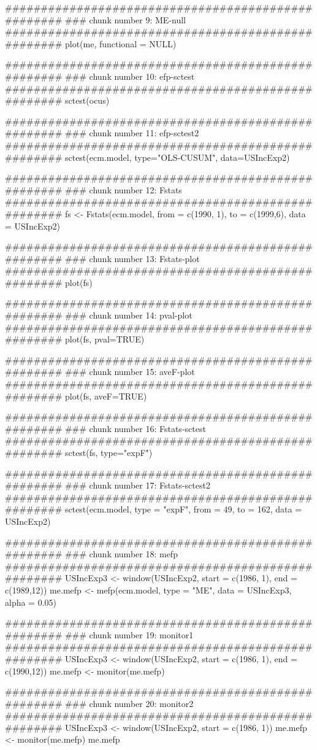 \begin{Examples}
\begin{ExampleCode}
###################################################
### chunk number 9: ME-null
###################################################
plot(me, functional = NULL)

###################################################
### chunk number 10: efp-sctest
###################################################
sctest(ocus)

###################################################
### chunk number 11: efp-sctest2
###################################################
sctest(ecm.model, type="OLS-CUSUM", data=USIncExp2)

###################################################
### chunk number 12: Fstats
###################################################
fs <- Fstats(ecm.model, from = c(1990, 1), to = c(1999,6), data = USIncExp2)

###################################################
### chunk number 13: Fstats-plot
###################################################
plot(fs)

###################################################
### chunk number 14: pval-plot
###################################################
plot(fs, pval=TRUE)

###################################################
### chunk number 15: aveF-plot
###################################################
plot(fs, aveF=TRUE)

###################################################
### chunk number 16: Fstats-sctest
###################################################
sctest(fs, type="expF")

###################################################
### chunk number 17: Fstats-sctest2
###################################################
sctest(ecm.model, type = "expF", from = 49, to = 162, data = USIncExp2)

###################################################
### chunk number 18: mefp
###################################################
USIncExp3 <- window(USIncExp2, start = c(1986, 1), end = c(1989,12))
me.mefp <- mefp(ecm.model, type = "ME", data = USIncExp3, alpha = 0.05)

###################################################
### chunk number 19: monitor1
###################################################
USIncExp3 <- window(USIncExp2, start = c(1986, 1), end = c(1990,12))
me.mefp <- monitor(me.mefp)

###################################################
### chunk number 20: monitor2
###################################################
USIncExp3 <- window(USIncExp2, start = c(1986, 1))
me.mefp <- monitor(me.mefp)
me.mefp


\end{ExampleCode}
\end{Examples}
